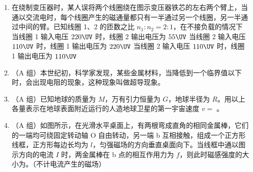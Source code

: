 \documentclass[\gkver]{gaokaozhenti}
\begin{document}
\begin{enumerate}
\item
在绕制变压器时，某人误将两个线圈绕在图示变压器铁芯的左右两个臂上，当通以交流电时，每个线圈产生的磁通量都只有一半通过另一个线圈，另一半通过中间的臂。已知线圈 1、2 的匝数之比 $n_{1}:n_{2} = 2:1$，在不接负载的情况下
\onepicture[w=5.5cm]{}
{当线圈 1 输入电压 $220\UV$ 时，线圈 2 输出电压为 $55\UV$}
{当线圈 2 输入电压 $110\UV$ 时，线圈 1 输出电压为 $220\UV$}
{当线圈 2 输入电压 $110\UV$ 时，线圈 1 输出电压为 $110\UV$}

\item
（A 组）本世纪初，科学家发现，某些金属材料，当降低到一个临界值以下时，会出现电阻的现象，这种现象叫做超导现象。

\item
（A 组）已知地球的质量为 $M$，万有引力恒量为 $G$，地球半径为 $R$。用以上各量表示在地球表面附近运行的人造地球卫星的第一宇宙速度 $v =$ 。

\item
（A 组）如图所示，在光滑水平桌面上，有两根弯成直角的相同金属棒，它们的一端均可绕固定转动轴 O 自由转动，另一端 b 互相接触，组成一个正方形线框，正方形每边长均为 $l$，匀强磁场的方向垂直桌面向下。当线框中通以图示方向的电流 $I$ 时，两金属棒在 b 点的相互作用力为 $f$，则此时磁感强度的大小为。（不计电流产生的磁场）
\onepicture[h=5.5cm, align=right]{}


\end{enumerate}
\end{document}
